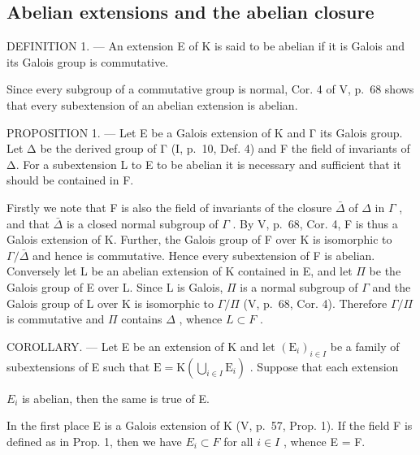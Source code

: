 \subsection{Abelian extensions and the abelian closure}

DEFINITION 1. --- An extension E of K is said to be abelian if it is Galois and its Galois group is commutative.

Since every subgroup of a commutative group is normal, Cor. 4 of V, p.~68 shows that every subextension of an abelian extension is abelian.

PROPOSITION 1. --- Let E be a Galois extension of K and Γ its Galois group. Let Δ be the derived group of Γ (I, p.~10, Def. 4) and F the field of invariants of Δ. For a subextension L to E to be abelian it is necessary and sufficient that it should be contained in F.

Firstly we note that F is also the field of invariants of the closure \(\bar{\Delta}\) of \(\Delta\) in \(\Gamma\) , and that \(\bar{\Delta}\) is a closed normal subgroup of \(\Gamma\) . By V, p.~68, Cor. 4, F is thus a Galois extension of K. Further, the Galois group of F over K is isomorphic to \(\Gamma/\bar{\Delta}\) and hence is commutative. Hence every subextension of F is abelian. Conversely let L be an abelian extension of K contained in E, and let \(\Pi\) be the Galois group of E over L. Since L is Galois, \(\Pi\) is a normal subgroup of \(\Gamma\) and the Galois group of L over K is isomorphic to \(\Gamma/\Pi\) (V, p.~68, Cor. 4). Therefore \(\Gamma/\Pi\) is commutative and \(\Pi\) contains \(\Delta\) , whence \(L \subset F\) .

COROLLARY. --- Let E be an extension of K and let \((\mathrm{E}_{i})_{i\in I}\) be a family of subextensions of E such that \(\mathrm{E}=\mathrm{K}\left(\bigcup_{i\in I}\mathrm{E}_{i}\right)\) . Suppose that each extension

\(E_{i}\) is abelian, then the same is true of E.

In the first place E is a Galois extension of K (V, p.~57, Prop. 1). If the field F is defined as in Prop. 1, then we have \(E_{i} \subset F\) for all \(i \in I\) , whence E = F.

